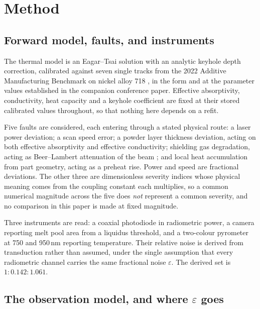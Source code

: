 \documentclass[preprint,12pt]{elsarticle}
\begin{document}
\section{Method}
\label{sec:method}

\subsection{Forward model, faults, and instruments}
\label{sec:forward}

The thermal model is an Eagar--Tsai solution with an analytic keyhole depth
correction, calibrated against seven single tracks from the 2022 Additive
Manufacturing Benchmark on nickel alloy 718 \cite{Weaver2024}, in the form and
at the parameter values established in the companion conference paper. Effective
absorptivity, conductivity, heat capacity and a keyhole coefficient are fixed at
their stored calibrated values throughout, so that nothing here depends on a
refit.

Five faults are considered, each entering through a stated physical route: a
laser power deviation; a scan speed error; a powder layer thickness deviation,
acting on both effective absorptivity and effective conductivity; shielding gas
degradation, acting as Beer--Lambert attenuation of the beam
\cite{Reijonen2020}; and local heat accumulation from part geometry, acting as a
preheat rise. Power and speed are fractional deviations. The other three are
dimensionless severity indices whose physical meaning comes from the coupling
constant each multiplies, so a common numerical magnitude across the five does
\emph{not} represent a common severity, and no comparison in this paper is made
at fixed magnitude.

Three instruments are read: a coaxial photodiode in radiometric power, a camera
reporting melt pool area from a liquidus threshold, and a two-colour pyrometer
at 750 and 950\,nm reporting temperature. Their relative noise is derived from
transduction rather than assumed, under the single assumption that every
radiometric channel carries the same fractional noise $\varepsilon$. The derived
set is $1 : 0.142 : 1.061$.

\subsection{The observation model, and where $\varepsilon$ goes}
\label{sec:obs}
\end{document}
